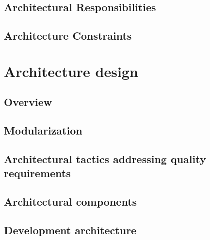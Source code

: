 \documentclass[hidelinks, 12pt, oneside]{article}
\begin{document}
\subsection{Architectural Responsibilities}

\subsection{Architecture Constraints}

\section{Architecture design}
\subsection{Overview}
\subsection{Modularization}
\subsection{Architectural tactics addressing quality requirements}
\subsection{Architectural components} 
\subsection{Development architecture} 
\end{document}
